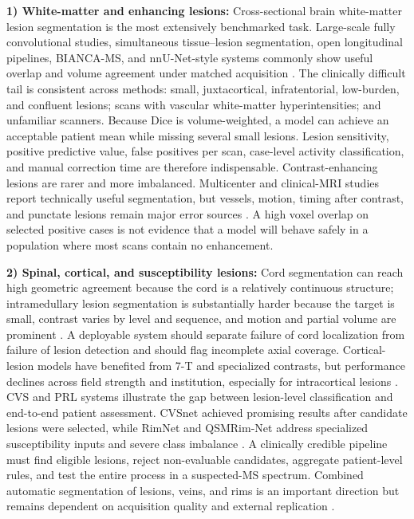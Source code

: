 \documentclass[journal,twoside,web]{ieeecolor}
\begin{document}
\textbf{1) White-matter and enhancing lesions:} Cross-sectional brain white-matter lesion segmentation is the most extensively benchmarked task. Large-scale fully convolutional studies, simultaneous tissue--lesion segmentation, open longitudinal pipelines, BIANCA-MS, and nnU-Net-style systems commonly show useful overlap and volume agreement under matched acquisition \cite{gabr,mckinley,cerri,bianca}. The clinically difficult tail is consistent across methods: small, juxtacortical, infratentorial, low-burden, and confluent lesions; scans with vascular white-matter hyperintensities; and unfamiliar scanners. Because Dice is volume-weighted, a model can achieve an acceptable patient mean while missing several small lesions. Lesion sensitivity, positive predictive value, false positives per scan, case-level activity classification, and manual correction time are therefore indispensable. Contrast-enhancing lesions are rarer and more imbalanced. Multicenter and clinical-MRI studies report technically useful segmentation, but vessels, motion, timing after contrast, and punctate lesions remain major error sources \cite{greselin,gadlesion}. A high voxel overlap on selected positive cases is not evidence that a model will behave safely in a population where most scans contain no enhancement.


\textbf{2) Spinal, cortical, and susceptibility lesions:} Cord segmentation can reach high geometric agreement because the cord is a relatively continuous structure; intramedullary lesion segmentation is substantially harder because the target is small, contrast varies by level and sequence, and motion and partial volume are prominent \cite{gros2019,benveniste}. A deployable system should separate failure of cord localization from failure of lesion detection and should flag incomplete axial coverage. Cortical-lesion models have benefited from 7-T and specialized contrasts, but performance declines across field strength and institution, especially for intracortical lesions \cite{larosa7t,molchanova}. CVS and PRL systems illustrate the gap between lesion-level classification and end-to-end patient assessment. CVSnet achieved promising results after candidate lesions were selected, while RimNet and QSMRim-Net address specialized susceptibility inputs and severe class imbalance \cite{cvsnet,rimnet,qsmrim}. A clinically credible pipeline must find eligible lesions, reject non-evaluable candidates, aggregate patient-level rules, and test the entire process in a suspected-MS spectrum. Combined automatic segmentation of lesions, veins, and rims is an important direction but remains dependent on acquisition quality and external replication \cite{alpaca,combined_markers}.
\end{document}
